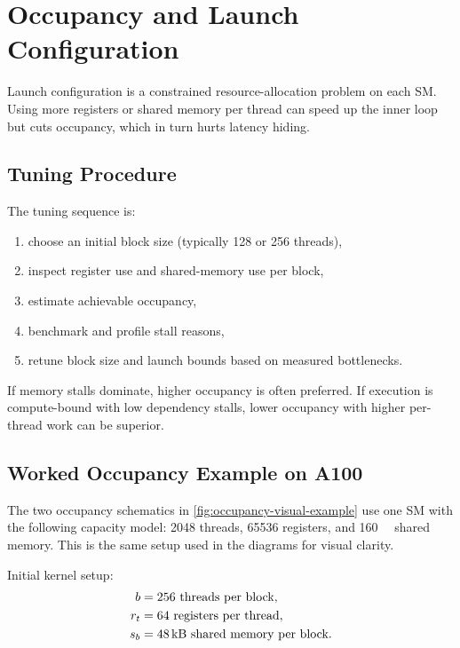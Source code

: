 \section{Occupancy and Launch Configuration}\label{sec:occupancy}

Launch configuration is a constrained resource-allocation problem on each SM.
Using more registers or shared memory per thread can speed up the inner loop
but cuts occupancy, which in turn hurts latency hiding.

\subsection{Tuning Procedure}

The tuning sequence is:

\begin{enumerate}
  \item choose an initial block size (typically 128 or 256 threads),
  \item inspect register use and shared-memory use per block,
  \item estimate achievable occupancy,
  \item benchmark and profile stall reasons,
  \item retune block size and launch bounds based on measured bottlenecks.
\end{enumerate}

If memory stalls dominate, higher occupancy is often preferred. If execution is
compute-bound with low dependency stalls, lower occupancy with higher
per-thread work can be superior.

\subsection{Worked Occupancy Example on A100}
\label{sec:occupancy-worked-example}

The two occupancy schematics in \cref{fig:occupancy-visual-example} use one SM
with the following capacity model:
\num{2048} threads, \num{65536} registers, and \SI{160}{\kilo\byte} shared
memory. This is the same setup used in the diagrams for visual clarity.

Initial kernel setup:
\begin{align}
  b &= 256 \text{ threads per block}, \\
  r_t &= 64 \text{ registers per thread}, \\
  s_b &= \SI{48}{\kilo\byte} \text{ shared memory per block}.
\end{align}

